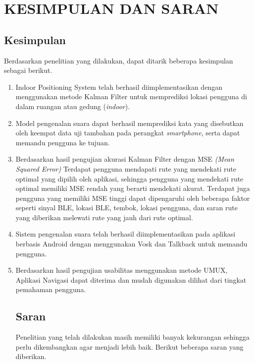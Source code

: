 \fancyhf{} 
\fancyfoot[R]{\thepage}
\chapter{KESIMPULAN DAN SARAN}

\section{Kesimpulan}
Berdasarkan penelitian yang dilakukan, dapat ditarik beberapa kesimpulan sebagai berikut.
\begin{enumerate}
	\item Indoor Positioning System telah berhasil diimplementasikan dengan menggunakan metode Kalman Filter untuk memprediksi lokasi pengguna di dalam ruangan atau gedung (\textit{indoor}).

   \item Model pengenalan suara dapat berhasil memprediksi kata yang disebutkan oleh keempat data uji tambahan pada perangkat \textit{smartphone}, serta dapat memandu pengguna ke tujuan.

   \item Berdasarkan hasil pengujian akurasi Kalman Filter dengan MSE \textit{(Mean Squared Error)} Terdapat pengguna mendapati rute yang mendekati rute optimal yang dipilih oleh aplikasi, sehingga pengguna yang mendekati rute optimal memiliki MSE rendah yang berarti mendekati akurat. Terdapat juga pengguna yang memiliki MSE tinggi dapat dipengaruhi oleh beberapa faktor seperti sinyal BLE, lokasi BLE, tembok, lokasi pengguna, dan saran rute yang diberikan melewati rute yang jauh dari rute optimal.

   \item Sistem pengenalan suara telah berhasil diimplementasikan pada aplikasi berbasis Android dengan menggunakan Vosk dan Talkback untuk memandu pengguna.

   \item Berdasarkan hasil pengujian usabilitas menggunakan metode UMUX, Aplikasi Navigasi dapat diterima dan mudah digunakan dilihat dari tingkat pemahaman pengguna.

  
\pagebreak
\section{Saran}
\par Penelitian yang telah dilakukan masih memiliki banyak kekurangan sehingga perlu dikembangkan agar menjadi lebih baik. Berikut beberapa saran yang diberikan.


\end{enumerate}
